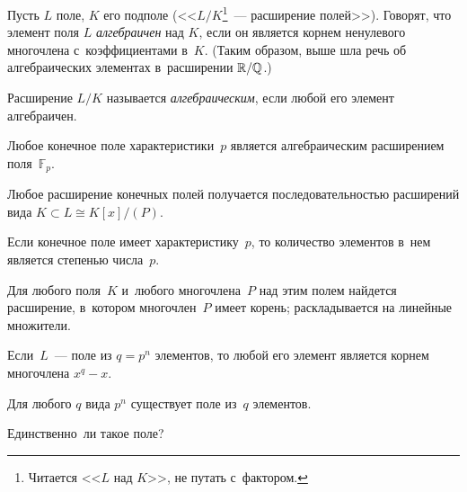 \documentclass[a4paper, 12pt]{article}
\begin{document}
Пусть $L$ поле, $K$ его подполе (<<$L/K$\footnote{Читается <<$L$ над $K$>>, не путать с~фактором.}~--- расширение полей>>). Говорят, что элемент поля $L$ \emph{алгебраичен} над $K$, если он является корнем ненулевого многочлена с~коэффициентами в~$K$. (Таким образом, выше шла речь об алгебраических элементах в~расширении $\mathbb{R}/\mathbb{Q}$.)

Расширение $L/K$ называется \emph{алгебраическим}, если любой его элемент алгебраичен.




Любое конечное поле характеристики~$p$ является алгебраическим расширением поля~$\mathbb F_p$.






Любое расширение конечных полей получается последовательностью расширений вида $K\subset L\cong K[x]/(P)$.

Если конечное поле имеет характеристику~$p$, то количество элементов в~нем является степенью числа~$p$.






Для любого поля~$K$ и~любого многочлена~$P$ над этим полем найдется расширение, в~котором многочлен~$P$
 имеет корень;  раскладывается на линейные множители.






 Если~$L$~--- поле из $q=p^n$ элементов, то любой его элемент является корнем многочлена $x^q-x$.

 Для любого $q$ вида $p^n$ существует поле из~$q$ элементов.

 Единственно~ли такое поле?











\end{document}
